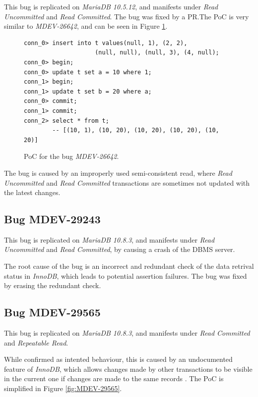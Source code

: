 This bug is replicated on \textit{MariaDB 10.5.12}, and manifests under \textit{Read Uncommitted} and \textit{Read Committed}. The bug was fixed by a PR.The PoC is very similar to \textit{MDEV-26642}, and can be seen in Figure \ref{fig:MDEV-26643}.


\begin{figure}
\begin{verbatim}
conn_0> insert into t values(null, 1), (2, 2),
                    (null, null), (null, 3), (4, null);
conn_0> begin;
conn_0> update t set a = 10 where 1;
conn_1> begin;
conn_1> update t set b = 20 where a;
conn_0> commit;
conn_1> commit;
conn_2> select * from t; 
        -- [(10, 1), (10, 20), (10, 20), (10, 20), (10, 20)]
\end{verbatim}
\caption{PoC for the bug \textit{MDEV-26642}.} \label{fig:MDEV-26643}
\end{figure}

The bug is caused by an improperly used semi-consistent read, where \textit{Read Uncommitted} and \textit{Read Committed} transactions are sometimes not updated with the latest changes.

\subsection*{Bug MDEV-29243}

This bug is replicated on \textit{MariaDB 10.8.3}, and manifests under \textit{Read Uncommitted} and \textit{Read Committed}, by causing a crash of the DBMS server.

The root cause of the bug is an incorrect and redundant check of the data retrival status in \textit{InnoDB}, which leads to potential assertion failures. The bug was fixed by erasing the redundant check.

\subsection*{Bug MDEV-29565}

This bug is replicated on \textit{MariaDB 10.8.3}, and manifests under \textit{Read Committed} and \textit{Repeatable Read}.

While confirmed as intented behaviour, this is caused by an undocumented feature of \textit{InnoDB}, which allows changes made by other transactions to be visible in the current one if changes are made to the same records \cite{mysqlconsistentread}. The PoC is simplified in Figure \ref{fig:MDEV-29565}.

